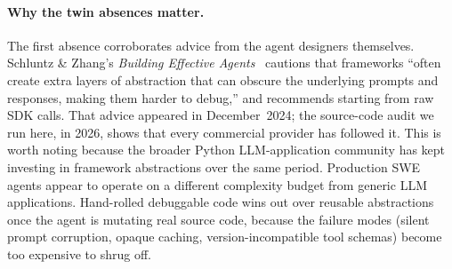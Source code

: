 \documentclass[11pt,a4paper]{article}
\begin{document}
\paragraph{Why the twin absences matter.}
The first absence corroborates advice from the agent designers themselves.
Schluntz \& Zhang's \emph{Building Effective Agents}~\cite{schluntz2024agents} cautions that frameworks ``often create extra layers of abstraction that can obscure the underlying prompts and responses, making them harder to debug,'' and recommends starting from raw SDK calls.
That advice appeared in December~2024; the source-code audit we run here, in 2026, shows that every commercial provider has followed it.
This is worth noting because the broader Python LLM-application community has kept investing in framework abstractions over the same period.
Production SWE agents appear to operate on a different complexity budget from generic LLM applications.
Hand-rolled debuggable code wins out over reusable abstractions once the agent is mutating real source code, because the failure modes (silent prompt corruption, opaque caching, version-incompatible tool schemas) become too expensive to shrug off.
\end{document}
